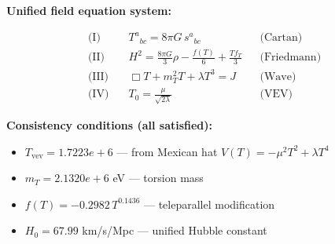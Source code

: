 
\textbf{Unified field equation system:}

\begin{align}
  \text{(I)} \quad & T^a{}_{bc} = 8\pi G \, s^a{}_{bc} && \text{(Cartan)} \\
  \text{(II)} \quad & H^2 = \frac{8\pi G}{3}\rho - \frac{f(T)}{6} + \frac{Tf_T}{3} && \text{(Friedmann)} \\
  \text{(III)} \quad & \Box T + m_T^2 T + \lambda T^3 = J && \text{(Wave)} \\
  \text{(IV)} \quad & T_0 = \frac{\mu}{\sqrt{2\lambda}} && \text{(VEV)}
\end{align}

\textbf{Consistency conditions (all satisfied):}
\begin{itemize}
  \item $T_{\text{vev}} = 1.7223e+6$ — from Mexican hat $V(T) = -\mu^2 T^2 + \lambda T^4$
  \item $m_T = 2.1320e+6$ eV — torsion mass
  \item $f(T) = -0.2982 \, T^{0.1436}$ — teleparallel modification
  \item $H_0 = 67.99$ km/s/Mpc — unified Hubble constant
\end{itemize}